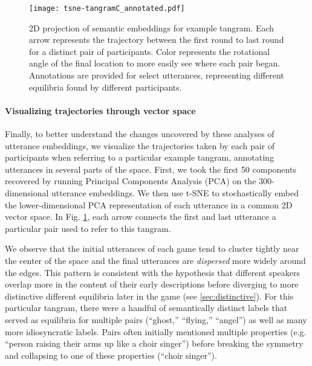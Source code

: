 \begin{figure}[t!]
\centering
\texttt{[image: tsne-tangramC\_annotated.pdf]}
\caption{2D projection of semantic embeddings for example tangram. Each arrow represents the trajectory between the first round to last round for a distinct pair of participants. Color represents the rotational angle of the final location to more easily see where each pair began. Annotations are provided for select utterances, representing different equilibria found by different participants.}
\label{fig:tsne}
\end{figure}


\paragraph{Visualizing trajectories through vector space}  
Finally, to better understand the changes uncovered by these analyses of utterance embeddings, we visualize the trajectories taken by each pair of participants when referring to a particular example tangram, annotating utterances in several parts of the space.
First, we took the first 50 components recovered by running Principal Components Analysis (PCA) on the 300-dimensional utterance embeddings. 
We then use t-SNE \cite{maaten2008visualizing} to stochastically embed the lower-dimensional PCA representation of each utterance in a common 2D vector space. 
In Fig. \ref{fig:tsne}, each arrow connects the first and last utterance a particular pair used to refer to this tangram.

We observe that the initial utterances of each game tend to cluster tightly near the center of the space and the final utterances are \emph{dispersed} more widely around the edges. 
This pattern is consistent with the hypothesis that different speakers overlap more in the content of their early descriptions before diverging to more distinctive different equilibria later in the game  (see \ref{sec:distinctive}). 
For this particular tangram, there were a handful of semantically distinct labels that served as equilibria for multiple pairs (``ghost,'' ``flying,'' ``angel'') as well as many more idiosyncratic labels.
Pairs often initially mentioned multiple properties (e.g. ``person raising their arms up like a choir singer'') before breaking the symmetry and collapsing to one of these properties (``choir singer'').


